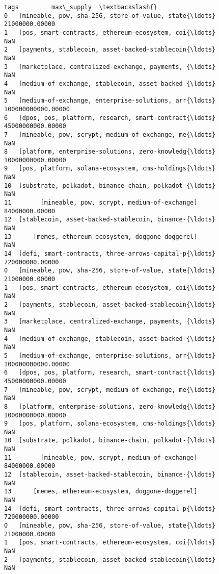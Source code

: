 \documentclass[11pt]{article}
\begin{document}
\begin{tcolorbox}[breakable, size=fbox, boxrule=.5pt, pad at break*=1mm, opacityfill=0]
\begin{Verbatim}[commandchars=\\\{\}]
                                                 tags         max\_supply  \textbackslash{}
0   [mineable, pow, sha-256, store-of-value, state{\ldots}     21000000.00000
1   [pos, smart-contracts, ethereum-ecosystem, coi{\ldots}                NaN
2   [payments, stablecoin, asset-backed-stablecoin{\ldots}                NaN
3   [marketplace, centralized-exchange, payments, {\ldots}                NaN
4   [medium-of-exchange, stablecoin, asset-backed-{\ldots}                NaN
5   [medium-of-exchange, enterprise-solutions, arr{\ldots} 100000000000.00000
6   [dpos, pos, platform, research, smart-contract{\ldots}  45000000000.00000
7   [mineable, pow, scrypt, medium-of-exchange, me{\ldots}                NaN
8   [platform, enterprise-solutions, zero-knowledg{\ldots}  10000000000.00000
9   [pos, platform, solana-ecosystem, cms-holdings{\ldots}                NaN
10  [substrate, polkadot, binance-chain, polkadot-{\ldots}                NaN
11        [mineable, pow, scrypt, medium-of-exchange]     84000000.00000
12  [stablecoin, asset-backed-stablecoin, binance-{\ldots}                NaN
13      [memes, ethereum-ecosystem, doggone-doggerel]                NaN
14  [defi, smart-contracts, three-arrows-capital-p{\ldots}    720000000.00000
0   [mineable, pow, sha-256, store-of-value, state{\ldots}     21000000.00000
1   [pos, smart-contracts, ethereum-ecosystem, coi{\ldots}                NaN
2   [payments, stablecoin, asset-backed-stablecoin{\ldots}                NaN
3   [marketplace, centralized-exchange, payments, {\ldots}                NaN
4   [medium-of-exchange, stablecoin, asset-backed-{\ldots}                NaN
5   [medium-of-exchange, enterprise-solutions, arr{\ldots} 100000000000.00000
6   [dpos, pos, platform, research, smart-contract{\ldots}  45000000000.00000
7   [mineable, pow, scrypt, medium-of-exchange, me{\ldots}                NaN
8   [platform, enterprise-solutions, zero-knowledg{\ldots}  10000000000.00000
9   [pos, platform, solana-ecosystem, cms-holdings{\ldots}                NaN
10  [substrate, polkadot, binance-chain, polkadot-{\ldots}                NaN
11        [mineable, pow, scrypt, medium-of-exchange]     84000000.00000
12  [stablecoin, asset-backed-stablecoin, binance-{\ldots}                NaN
13      [memes, ethereum-ecosystem, doggone-doggerel]                NaN
14  [defi, smart-contracts, three-arrows-capital-p{\ldots}    720000000.00000
0   [mineable, pow, sha-256, store-of-value, state{\ldots}     21000000.00000
1   [pos, smart-contracts, ethereum-ecosystem, coi{\ldots}                NaN
2   [payments, stablecoin, asset-backed-stablecoin{\ldots}                NaN

\end{Verbatim}
\end{tcolorbox}
\end{document}
